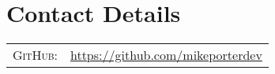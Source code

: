 \section{Contact Details}

\begin{tabular}{rl}
    \textsc{GitHub:}	& \href{https://github.com/mikeporterdev/}{https://github.com/mikeporterdev} 
\end{tabular}